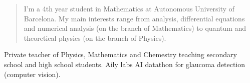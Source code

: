 \documentclass[10pt,a4paper,ragged2e,withhyper]{altacv}
\begin{document}
\begin{paracol}{2}






  \newpage

  \switchcolumn

  \begin{quote}
    I'm a 4th year student in Mathematics at Autonomous University of Bar\-ce\-lo\-na. My main interests range from analysis, differential equations and numerical analysis (on the branch of Mathematics) to quantum and theoretical physics (on the branch of Physics).
  \end{quote}

  Private teacher of Physics, Mathematics and Chemestry teaching secondary school and high school students.
  \divider
  Aily labs AI datathon for glaucoma detection (computer vision).


\end{paracol}
\end{document}
